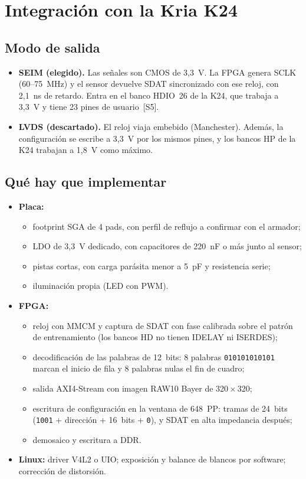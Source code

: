 \documentclass[11pt,a4paper]{article}
\begin{document}
\section{Integración con la Kria K24}

\subsection{Modo de salida}
\begin{itemize}
  \item \textbf{SEIM (elegido).} Las señales son CMOS de 3,3~V. La FPGA genera SCLK (60--75~MHz) y el sensor devuelve SDAT sincronizado con ese reloj, con 2,1~ns de retardo. Entra en el banco HDIO~26 de la K24, que trabaja a 3,3~V y tiene 23 pines de usuario~[S5].
  \item \textbf{LVDS (descartado).} El reloj viaja embebido (Manchester). Además, la configuración se escribe a 3,3~V por los mismos pines, y los bancos HP de la K24 trabajan a 1,8~V como máximo.
\end{itemize}

\subsection{Qué hay que implementar}
\begin{itemize}
  \item \textbf{Placa:}
  \begin{itemize}
    \item footprint SGA de 4 pads, con perfil de reflujo a confirmar con el armador;
    \item LDO de 3,3~V dedicado, con capacitores de 220~nF o más junto al sensor;
    \item pistas cortas, con carga parásita menor a 5~pF y resistencia serie;
    \item iluminación propia (LED con PWM).
  \end{itemize}
  \item \textbf{FPGA:}
  \begin{itemize}
    \item reloj con MMCM y captura de SDAT con fase calibrada sobre el patrón de entrenamiento (los bancos HD no tienen IDELAY ni ISERDES);
    \item decodificación de las palabras de 12~bits: 8 palabras \texttt{010101010101} marcan el inicio de fila y 8 palabras nulas el fin de cuadro;
    \item salida AXI4-Stream con imagen RAW10 Bayer de 320\,$\times$\,320;
    \item escritura de configuración en la ventana de 648~PP: tramas de 24~bits (\texttt{1001} + dirección + 16~bits + \texttt{0}), y SDAT en alta impedancia después;
    \item demosaico y escritura a DDR.
  \end{itemize}
  \item \textbf{Linux:} driver V4L2 o UIO; exposición y balance de blancos por software; corrección de distorsión.
\end{itemize}
\end{document}
